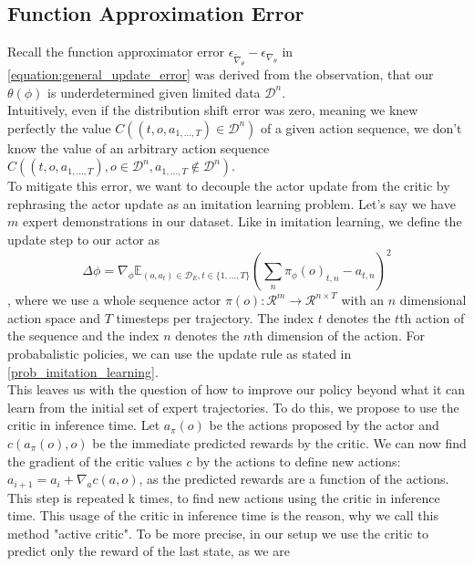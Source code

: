 \subsection{Function Approximation Error}
\label{func_app_error}
Recall the function approximator error $\epsilon_{\widetilde{\nabla}_{\theta}} - \epsilon_{\nabla_{\theta}}$ in \ref{equation:general_update_error} was derived from the observation, that our $\theta(\phi)$ is underdetermined 
given limited data $\mathcal{D}^n$. \\
Intuitively, even if the distribution shift error was zero, meaning we knew perfectly the value 
$C((t, o, a_{1,...,T}) \in \mathcal{D}^n)$ of a given action sequence, we don't know the value of an arbitrary action sequence \\
$C((t, o, a_{1,...,T}), o \in \mathcal{D}^n, a_{1,...,T} \notin \mathcal{D}^n)$.\\
To mitigate this error, we want to decouple the actor update from the critic by rephrasing the actor update as an imitation learning problem. 
Let's say we have $m$ expert demonstrations in our dataset. 
Like in imitation learning, we define the update step to our actor as
\begin{equation}
    \Delta \phi = \nabla_{\phi} \mathbb{E}_{(o, a_{t}) \in \mathcal{D}_E, t \in \{1, ..., T\}}\left(\sum_n \pi_{\phi}(o)_{t, n} - a_{t, n}\right)^2
\end{equation}
, where we use a whole sequence actor 
$\pi(o):\mathcal{R}^m \rightarrow \mathcal{R}^{n \times T}$ with an $n$ dimensional action space and $T$ timesteps per trajectory. The index $t$ denotes the $t$th action of the sequence and the index $n$ denotes the $n$th dimension of 
the action. For probabalistic policies, we can use the update rule as stated in \ref{prob_imitation_learning}.\\
This leaves us with the question of how to improve our policy beyond what it can learn from the initial set of expert trajectories. To do this, we propose to use 
the critic in inference time. Let $a_{\pi}(o)$ be the actions proposed by the actor and $c(a_{\pi}(o), o)$ be the immediate predicted rewards by the critic. 
We can now find the gradient of the critic values $c$ by the actions to define new actions: $a_{i+1} = a_i + \nabla_{a}c(a, o)$, as the predicted rewards are a 
function of the actions. This step is repeated k times, to find new actions using the critic in inference time. This usage of the critic in inference time 
is the reason, why we call this method "active critic". To be more precise, in our setup we use the critic to predict only the reward of the last state, as we are 
